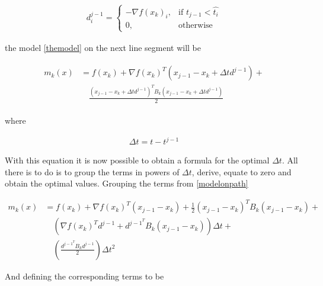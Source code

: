 \begin{equation}
  \begin{aligned}
    d_i^{j-1} = 
    \begin{cases}
      -\nabla f(x_k)_i, & \text{if } t_{j-1} < \hat{t_i} \\
      0, & \text{otherwise}
    \end{cases}
  \end{aligned}
\end{equation}

the model \ref{themodel} on the next line segment will be

\begin{equation} \label{modelonpath}
  \begin{aligned}
    \begin{split}
    m_k(x) & = f(x_k) + \nabla f(x_k)^T ( x_{j-1} - x_k + \Delta t d^{j-1}) + \\
     & \quad \frac{( x_{j-1} - x_k + \Delta t d^{j-1})^T B_k ( x_{j-1} - x_k + \Delta t d^{j-1})}{2}
    \end{split}
  \end{aligned}
\end{equation}

where

\begin{equation*}
  \begin{aligned}
    \Delta t = t - t^{j-1}
  \end{aligned}
\end{equation*}

With this equation it is now possible to obtain a formula for the optimal $\Delta t$.  All there is to do is to group the terms in powers of $\Delta t$, derive, equate to zero and obtain the optimal values. Grouping the terms from \ref{modelonpath}

\begin{equation} \label{cauchyterms}
  \begin{aligned}
    m_k(x) & = f(x_k) + \nabla f(x_k)^T ( x_{j-1} - x_k) + 
    \frac{1}{2} ( x_{j-1} - x_k)^T B_k ( x_{j-1} - x_k) + \\
    & \quad \left( \nabla f(x_k)^T d^{j-1} + d^{{j-1}^T} B_k (x_{j-1} - x_k) 
    \right) \Delta t + \\
    & \quad \left( \frac{d^{{j-1}^T} B_k d^{j-1}}{2} \right) \Delta t^2
  \end{aligned}
\end{equation}

And defining the corresponding terms to be

